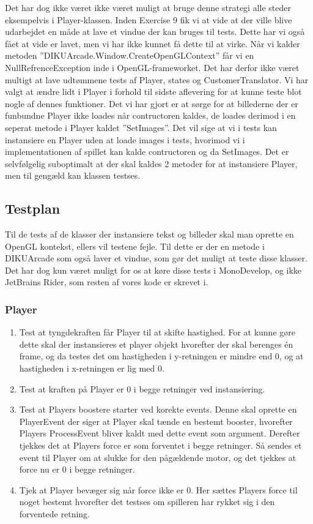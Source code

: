    Det har dog ikke været ikke været muligt at bruge denne strategi alle steder eksempelvis i Player-klassen. Inden Exercise 9 fik vi at vide at der ville blive udarbejdet en måde at lave et vindue der kan bruges til tests. Dette har vi også fået at vide er lavet, men vi har ikke kunnet få dette til at virke. Når vi kalder metoden ''DIKUArcade.Window.CreateOpenGLContext'' får vi en NullRefrenceException inde i OpenGL-frameworket. Det har derfor ikke været multigt at lave udtømmene tests af Player, states og CustomerTranslator. Vi har valgt at ændre lidt i Player i forhold til sidste aflevering for at kunne teste blot nogle af dennes funktioner. Det vi har gjort er at sørge for at billederne der er funbundne Player ikke loades når contructoren kaldes, de loades derimod i en seperat metode i Player kaldet ''SetImages''. Det vil sige at vi i tests kan instansiere en Player uden at loade images i tests, hvorimod vi i implementationen af spillet kan kalde contructoren og da SetImages. Det er selvfølgelig suboptimalt at der skal kaldes 2 metoder for at instansiere Player, men til gengæld kan klassen testses. 

\subsection{Testplan}
   Til de tests af de klasser der instansiere tekst og billeder skal man oprette en OpenGL kontekst, ellers vil testene fejle. Til dette er der en metode i DIKUArcade som også laver et vindue, som gør det muligt at teste disse klasser. Det har dog kun været muligt for os at køre disse tests i MonoDevelop, og ikke JetBrains Rider, som resten af vores kode er skrevet i.
   \subsubsection{Player}
      \begin{enumerate}
         \item Test at tyngdekraften får Player til at skifte hastighed. For at kunne gøre dette skal der instansieres et player objekt hvorefter der skal berenges én frame, og da testes det om hastigheden i y-retningen er mindre end 0, og at hastigheden i x-retningen er lig med 0.
         \item Test at kraften på Player er 0 i begge retninger ved instansiering. 
         \item Test at Players boostere starter ved korekte events. Denne skal oprette en PlayerEvent der siger at Player skal tænde en bestemt booster, hvorefter Players ProcessEvent bliver kaldt med dette event som argument. Derefter tjekkes det at Players force er som forventet i begge retninger. Så sendes et event til Player om at slukke for den pågældende motor, og det tjekkes at force nu er 0 i begge retninger.
         \item Tjek at Player bevæger sig når force ikke er 0. Her sættes Players force til noget bestemt hvorefter det testses om spilleren har rykket sig i den forventede retning. 
      \end{enumerate}
